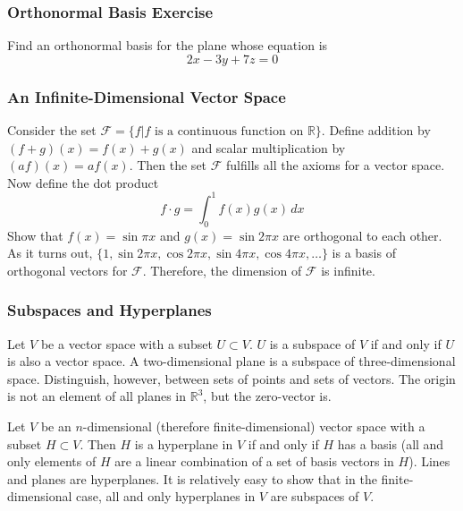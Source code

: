 \documentclass[xcolor=dvipsnames]{beamer}
\begin{document}
\begin{frame}
  \frametitle{Orthonormal Basis Exercise}
  {\ubung} Find an orthonormal basis for the plane whose equation is
  \begin{equation}
    \label{eq:deidongo}
    2x-3y+7z=0
  \end{equation}
\end{frame}

\begin{frame}
  \frametitle{An Infinite-Dimensional Vector Space}
  Consider the set $\mathcal{F}=\{f|f\mbox{ is a continuous function
    on }\mathbb{R}\}$. Define addition by $(f+g)(x)=f(x)+g(x)$ and
  scalar multiplication by $(af)(x)=af(x)$. Then the set $\mathcal{F}$
  fulfills all the axioms for a vector space. Now define the dot
  product
  \begin{equation}
    \label{eq:ivaichoh}
    f\cdot{}g=\int_{0}^{1}f(x)g(x)\,dx
  \end{equation}
Show that $f(x)=\sin\pi{}x$ and $g(x)=\sin{}2\pi{}x$ are orthogonal to
each other. As it turns out,
$\{1,\sin{}2\pi{}x,\cos{}2\pi{}x,\sin{}4\pi{}x,\cos{}4\pi{}x,{\ldots}\}$
is a basis of orthogonal vectors for $\mathcal{F}$. Therefore, the
dimension of $\mathcal{F}$ is infinite. 
\end{frame}

\begin{frame}
  \frametitle{Subspaces and Hyperplanes}
  Let $V$ be a vector space with a subset $U\subset{}V$. $U$ is a
  \alert{subspace} of $V$ if and only if $U$ is also a vector space. A
  two-dimensional plane is a subspace of three-dimensional space.
  Distinguish, however, between sets of points and sets of vectors.
  The origin is not an element of all planes in $\mathbb{R}^{3}$, but
  the zero-vector is.

  \medskip

  Let $V$ be an $n$-dimensional (therefore finite-dimensional) vector
  space with a subset $H\subset{}V$. Then $H$ is a \alert{hyperplane}
  in $V$ if and only if $H$ has a basis (all and only elements of $H$
  are a linear combination of a set of basis vectors in $H$). Lines
  and planes are hyperplanes. It is relatively easy to show that in
  the finite-dimensional case, all and only hyperplanes in $V$ are
  subspaces of $V$.
\end{frame}
\end{document}
